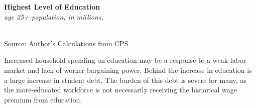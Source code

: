 \documentclass{report}
\newcommand{\tbllink}[1]{\href{https://raw.githubusercontent.com/bdecon/US-chartbook/master/chartbook/data/#1}{\faTable}}
\newcommand{\barylab}[2]{yticklabel style={text width=#1, align=right, 
		style={black!70}, text height=#2},}
\newcommand{\bbar}[2]{extra #1 ticks = {{#2}}, extra #1 tick labels = ,
		extra #1 tick style = {grid=major, grid style={thick, black!25}},}
\newcommand{\barplotnogrid}{xbar=0pt, axis line style={draw=none},
	    yticklabel style={align=left, anchor=east},
      		xmajorticks=false, ymajorgrids=false,   
	    ytick=data, tickwidth=0pt, area legend, reverse legend,
	    nodes near coords align={horizontal},}
\begin{document}
{\begin{minipage}{0.33\textwidth}
\small  
\end{minipage}\hspace{6mm}
\begin{minipage}{0.38\textwidth}
\normalsize \textbf{Highest Level of Education}\\
\footnotesize{\textit{age 25+ population, in millions, }}\\
\hspace*{-4mm} \\
\footnotesize{Source: Author's Calculations from CPS} \hfill \tbllink{cps_educ_tot.csv}
\end{minipage}
\vspace{1mm}

\begin{minipage}{0.76\textwidth}
\small 

Increased household spending on education may be a response to a weak labor market and lack of worker bargaining power. Behind the increase in education is a large increase in student debt. The burden of this debt is severe for many, as the more-educated workforce is not necessarily receiving the historical wage premium from education. 
\vspace{2mm}


\end{minipage}}
\end{document}
